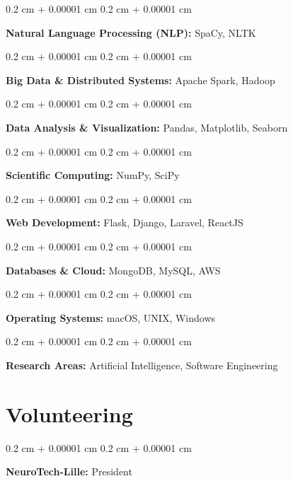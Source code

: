 \documentclass[10pt, letterpaper]{article}
\newenvironment{onecolentry}{
    \begin{adjustwidth}{
        0.2 cm + 0.00001 cm
    }{
        0.2 cm + 0.00001 cm
    }
}{
    \end{adjustwidth}
} %
\begin{document}
    \begin{onecolentry}
        \textbf{Natural Language Processing (NLP):} SpaCy, NLTK
    \end{onecolentry}
    \vspace{0.2 cm}

    \begin{onecolentry}
        \textbf{Big Data \& Distributed Systems:} Apache Spark, Hadoop
    \end{onecolentry}
    \vspace{0.2 cm}

    \begin{onecolentry}
        \textbf{Data Analysis \& Visualization:} Pandas, Matplotlib, Seaborn
    \end{onecolentry}
    \vspace{0.2 cm}

    \begin{onecolentry}
        \textbf{Scientific Computing:} NumPy, SciPy
    \end{onecolentry}
    \vspace{0.2 cm}

    \begin{onecolentry}
        \textbf{Web Development:} Flask, Django, Laravel, ReactJS
    \end{onecolentry}
    \vspace{0.2 cm}

    \begin{onecolentry}
        \textbf{Databases \& Cloud:} MongoDB, MySQL, AWS
    \end{onecolentry}
    \vspace{0.2 cm}

    \begin{onecolentry}
        \textbf{Operating Systems:} macOS, UNIX, Windows
    \end{onecolentry}
    \vspace{0.2 cm}

    \begin{onecolentry}
        \textbf{Research Areas:} Artificial Intelligence, Software Engineering
    \end{onecolentry}


    \section{Volunteering}

    \begin{onecolentry}
        \textbf{NeuroTech-Lille:} President
    \end{onecolentry}
    \vspace{0.2 cm}
\end{document}
